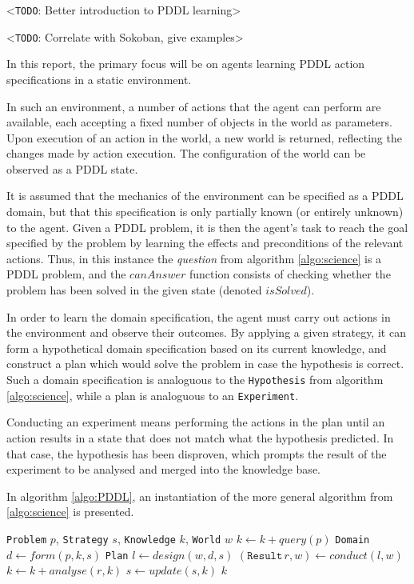 \documentclass[../Master.tex]{subfiles}
\begin{document}
<\texttt{TODO}: Better introduction to PDDL learning>

<\texttt{TODO}: Correlate with Sokoban, give examples>

In this report, the primary focus will be on agents learning PDDL action specifications in a static environment.

In such an environment, a number of actions that the agent can perform are available, each accepting a fixed number of objects in the world as parameters. Upon execution of an action in the world, a new world is returned, reflecting the changes made by action execution. The configuration of the world can be observed as a PDDL state.

It is assumed that the mechanics of the environment can be specified as a PDDL domain, but that this specification is only partially known (or entirely unknown) to the agent. Given a PDDL problem, it is then the agent's task to reach the goal specified by the problem by learning the effects and preconditions of the relevant actions. Thus, in this instance the \textit{question} from algorithm \ref{algo:science} is a PDDL problem, and the $canAnswer$ function consists of checking whether the problem has been solved in the given state (denoted $isSolved$).

In order to learn the domain specification, the agent must carry out actions in the environment and observe their outcomes. By applying a given strategy, it can form a hypothetical domain specification based on its current knowledge, and construct a plan which would solve the problem in case the hypothesis is correct. Such a domain specification is analoguous to the \texttt{Hypothesis} from algorithm \ref{algo:science}, while a plan is analoguous to an \texttt{Experiment}.

Conducting an experiment means performing the actions in the plan until an action results in a state that does not match what the hypothesis predicted. In that case, the hypothesis has been disproven, which prompts the result of the experiment to be analysed and merged into the knowledge base.

In algorithm \ref{algo:PDDL}, an instantiation of the more general algorithm from \ref{algo:science} is presented.

\begin{algorithm}
    \caption{}
    \label{algo:PDDL}

    \begin{algorithmic}
         {\texttt{Problem} $p$, \texttt{Strategy} $s$, \texttt{Knowledge} $k$, \texttt{World} $w$}
                \State $k \gets k + query(p)$
                \State \texttt{Domain} $d \gets form(p, k, s)$
                \State \texttt{Plan} $l \gets design(w, d, s)$
                \State $(\texttt{Result} \, r, w) \gets conduct(l, w)$
                \State $k \gets k + analyse(r, k)$
                \State $s \gets update(s, k)$
            \EndWhile
            \State \Return $k$
        \EndFunction
    \end{algorithmic}
\end{algorithm}
\end{document}
